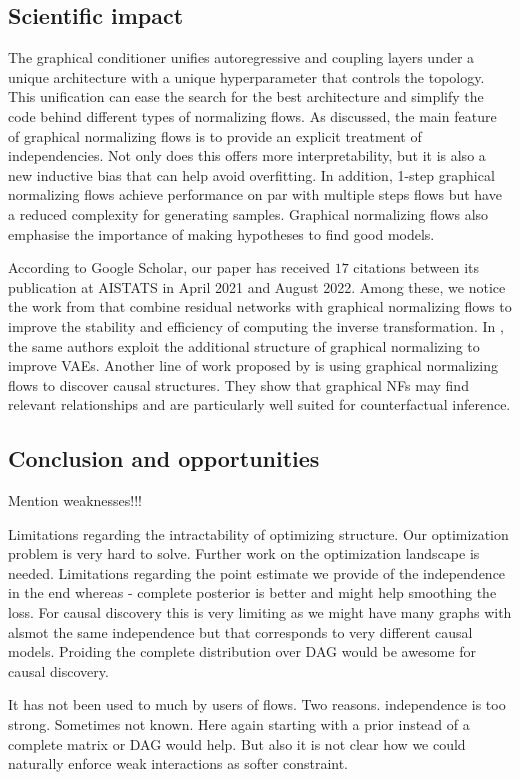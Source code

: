 \subsection{Scientific impact}
The graphical conditioner unifies autoregressive and coupling layers under a unique architecture with a unique hyperparameter that controls the topology. This unification can ease the search for the best architecture and simplify the code behind different types of normalizing flows. As discussed, the main feature of graphical normalizing flows is to provide an explicit treatment of independencies. Not only does this offers more interpretability, but it is also a new inductive bias that can help avoid overfitting. In addition, 1-step graphical normalizing flows achieve performance on par with multiple steps flows but have a reduced complexity for generating samples. Graphical normalizing flows also emphasise the importance of making hypotheses to find good models.

According to Google Scholar, our paper has received $17$ citations between its publication at AISTATS in April 2021 and August 2022. Among these, we notice the work from \citet{mouton2022graphical} that combine residual networks with graphical normalizing flows to improve the stability and efficiency of computing the inverse transformation. In \citet{mouton2022siren}, the same authors exploit the additional structure of graphical normalizing to improve VAEs. Another line of work proposed by \citet{balgi2022personalized} is using graphical normalizing flows to discover causal structures. They show that graphical NFs may find relevant relationships and are particularly well suited for counterfactual inference. 
\subsection{Conclusion and opportunities}
Mention weaknesses!!!

Limitations regarding the intractability of optimizing structure. Our optimization problem is very hard to solve. Further work on the optimization landscape is needed. Limitations regarding the point estimate we provide of the independence in the end whereas - complete posterior is better and might help smoothing the loss. For causal discovery this is very limiting as we might have many graphs with alsmot the same independence but that corresponds to very different causal models. Proiding the complete distribution over DAG would be awesome for causal discovery.

It has not been used to much by users of flows. Two reasons. independence is too strong. Sometimes not known. Here again starting with a prior instead of a complete matrix or DAG would help. But also it is not clear how we could naturally enforce weak interactions as softer constraint.

